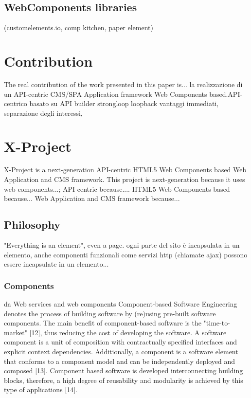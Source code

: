 \documentclass{sig-alternate}
\begin{document}
\subsection{WebComponents libraries}

(customelements.io, comp kitchen, paper element)

\section{Contribution}

The real contribution of the work presented in this paper is...
la realizzazione di un API-centric CMS/SPA Application framework Web Components based.API-centrico basato su API builder strongloop loopback vantaggi immediati, separazione degli interessi, 

\section{X-Project}

X-Project is a next-generation API-centric HTML5 Web Components based Web Application and CMS framework.
This project is next-generation because it uses web components...;
API-centric because....
HTML5 Web Components based because...
Web Application and CMS framework because...



\subsection{Philosophy}

"Everything is an element", even a page. 
ogni parte del sito è incapsulata in un elemento, anche componenti funzionali come servizi http (chiamate ajax) possono essere incapsulate in un elemento...

\subsubsection{Components}

da Web services and web components
Component-based Software Engineering denotes the process of building software by (re)using pre-built software components. The main benefit of component-based software is the "time-to-market" [12], thus reducing the cost of developing the software. A software component is a unit of composition with contractually specified interfaces and explicit context dependencies. Additionally, a component is a software element that conforms to a component model and can be independently deployed and composed [13]. Component based software is developed interconnecting building blocks, therefore, a high degree of reusability and modularity is achieved by this type of applications [14].
\end{document}
